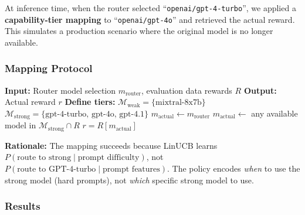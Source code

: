At inference time, when the router selected ``\texttt{openai/gpt-4-turbo}'', we applied a \textbf{capability-tier mapping} to ``\texttt{openai/gpt-4o}'' and retrieved the actual reward. This simulates a production scenario where the original model is no longer available.

\subsubsection{Mapping Protocol}

\begin{algorithm}[h]
\caption{Capability-Tier Model Mapping}
\label{alg:model_mapping}
\begin{algorithmic}[1]
\STATE \textbf{Input:} Router model selection $m_{\text{router}}$, evaluation data rewards $R$
\STATE \textbf{Output:} Actual reward $r$
\STATE
\STATE \textbf{Define tiers:}
\STATE \hspace{0.5cm} $\mathcal{M}_{\text{weak}} = \{\text{mixtral-8x7b}\}$
\STATE \hspace{0.5cm} $\mathcal{M}_{\text{strong}} = \{\text{gpt-4-turbo, gpt-4o, gpt-4.1}\}$
\STATE
{}
    \STATE $m_{\text{actual}} \gets m_{\text{router}}$ 
    \STATE $m_{\text{actual}} \gets $ any available model in $\mathcal{M}_{\text{strong}} \cap R$
\ENDIF
\STATE
\RETURN $r = R[m_{\text{actual}}]$
\end{algorithmic}
\end{algorithm}

\textbf{Rationale:} The mapping succeeds because LinUCB learns $P(\text{route to strong} \mid \text{prompt difficulty})$, not $P(\text{route to GPT-4-turbo} \mid \text{prompt features})$. The policy encodes \emph{when} to use the strong model (hard prompts), not \emph{which} specific strong model to use.

\subsubsection{Results}

